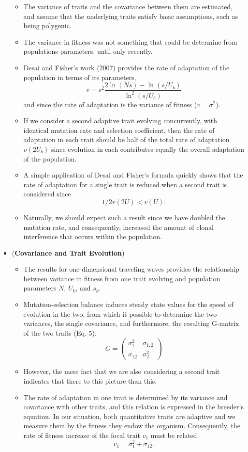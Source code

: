 \documentclass[11pt,one column]{article}
\begin{document}
\begin{itemize}
\begin{itemize}
	\item The variance of traits and the covariance between them are estimated, and assume that the underlying traits satisfy basic assumptions, such as being polygenic. 
	\item The variance in fitness was not something that could be determine from populations parameters, until only recently. 
	\item Desai and Fisher’s work (2007) provides the rate of adaptation of the population in terms of its parameters, \[v =s^2  \frac{2 \ln(Ns)-\ln(s/U_b)}{\ln^2(s/U_b)}\] and since the rate of adaptation is the variance of fitness ($v=\sigma^2$).
	\item If we consider a second adaptive trait evolving concurrently, with identical mutation rate and selection coefficient, then the rate of adaptation in each trait should be half of the total rate of adaptation $v(2U_b)$ since evolution in each contributes equally the overall adaptation of the population. 
	\item A simple application of Desai and Fisher’s formula quickly shows that the rate of adaptation for a single trait is reduced when a second trait is considered since \[ 1/2  v(2U)<v(U). \]
	\item Naturally, we should expect such a result since we have doubled the mutation rate, and consequently, increased the amount of clonal interference that occurs within the population. 
	\end{itemize}
\item (\textbf{Covariance and Trait Evolution})
	\begin{itemize}
	\item The results for one-dimensional traveling waves provides the relationship between variance in fitness from one trait evolving and population parameters $N$, $U_k$, and $s_k$. 
	\item Mutation-selection balance induces steady state values for the speed of evolution in the two, from which it possible to determine the two variances, the single covariance, and furthermore, the resulting G-matrix of the two traits (Eq. 5). \[ G= \left( \begin{array}{cc} \sigma_1^2& \sigma_{1,2}\\ \sigma_{12} & \sigma_2^2 \end{array} \right) \]
	\item However, the mere fact that we are also considering a second trait indicates that there to this picture than this.
	\item The rate of adaptation in one trait is determined by its variance and covariance with other traits, and this relation is expressed in the breeder’s equation. In our situation, both quantitative traits are adaptive and we measure them by the fitness they endow the organism. Consequently, the rate of fitness increase of the focal trait $v_1$ must be related \[v_1=\sigma_1^2+\sigma_{12}.\]

\end{itemize}
\end{itemize}
\end{document}
